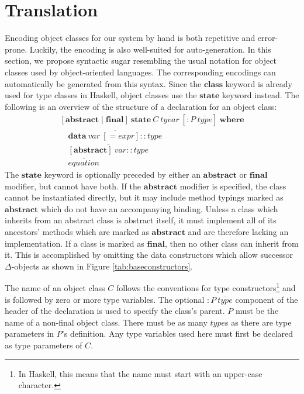 \section{Translation}
\label{sec:auto}

Encoding object classes for our system by hand is both repetitive and error-prone. Luckily, the encoding is also well-suited for auto-generation. In this section, we propose syntactic sugar resembling the usual notation for object classes used by object-oriented languages. The corresponding encodings can automatically be generated from this syntax. Since the $\mathbf{class}$ keyword is already used for type classes in Haskell, object classes use the $\mathbf{state}$ keyword instead. The following is an overview of the structure of a declaration for an object class:
\begin{displaymath}
\begin{array}{l}
[\mathbf{abstract} \mid \mathbf{final}]~\mathbf{state}~\mathit{C}~\overline{\mathit{tyvar}}~[: P~\overline{\mathit{type}}]~\mathbf{where} \\
\quad \overline{\mathbf{data}~\mathit{var}~[= \mathit{expr}] :: \mathit{type}} \\
\quad \overline{[\mathbf{abstract}]~\mathit{var} :: \mathit{type}} \\
\quad \overline{\mathit{equation}}
\end{array}
\end{displaymath}
The $\mathbf{state}$ keyword is optionally preceded by either an $\mathbf{abstract}$ or $\mathbf{final}$ modifier, but cannot have both. If the $\mathbf{abstract}$ modifier is specified, the class cannot be instantiated directly, but it may include method typings marked as $\mathbf{abstract}$ which do not have an accompanying binding. Unless a class which inherits from an abstract class is abstract itself, it must implement all of its ancestors' methods which are marked as $\mathbf{abstract}$ and are therefore lacking an implementation. If a class is marked as $\mathbf{final}$, then no other class can inherit from it. This is accomplished by omitting the data constructors which allow successor $\Delta$-objects as shown in Figure \ref{tab:baseconstructors}.

The name of an object class $C$ follows the conventions for type constructors\footnote{In Haskell, this means that the name must start with an upper-case character.} and is followed by zero or more type variables. The optional $: \mathit{P}~\overline{\mathit{type}}$ component of the header of the declaration is used to specify the class's parent. $P$ must be the name of a non-final object class. There must be as many $\mathit{type}$s as there are type parameters in $P$'s definition. Any type variables used here must first be declared as type parameters of $C$.

